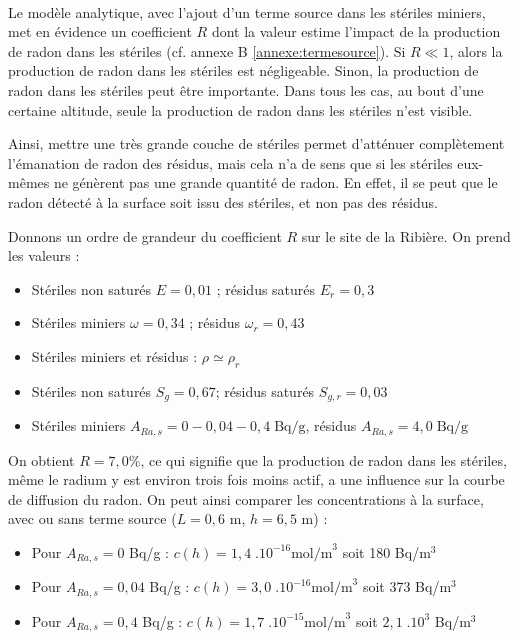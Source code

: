 \documentclass{article}
\begin{document}
\paragraph{} Le modèle analytique, avec l'ajout d'un terme source dans les stériles miniers, met en évidence un coefficient $R$ dont la valeur estime l'impact de la production de radon dans les stériles (cf. annexe B \ref{annexe:termesource}). Si $R\ll 1$, alors la production de radon dans les stériles est négligeable. Sinon, la production de radon dans les stériles peut être importante. Dans tous les cas, au bout d'une certaine altitude, seule la production de radon dans les stériles n'est visible.

Ainsi, mettre une très grande couche de stériles permet d'atténuer complètement l'émanation de radon des résidus, mais cela n'a de sens que si les stériles eux-mêmes ne génèrent pas une grande quantité de radon. En effet, il se peut que le radon détecté à la surface soit issu des stériles, et non pas des résidus.

Donnons un ordre de grandeur du coefficient $R$ sur le site de la Ribière. On prend les valeurs :
\begin{itemize}
  \item Stériles non saturés $E=0,01$ ; résidus saturés $E_r=0,3$ 
  \item Stériles miniers $\omega = 0,34$ ; résidus $\omega_r = 0,43 $
  \item Stériles miniers et résidus : $\rho \simeq \rho_r$
  \item Stériles non saturés $S_g = 0,67$; résidus saturés $S_{g,r}=0,03$
  \item Stériles miniers $A_{Ra,s}= 0 - 0,04 - 0,4 \; \text{Bq/g}$, résidus $A_{Ra,s}= 4,0 \; \text{Bq/g}$
\end{itemize}
On obtient $ R=7,0\%$, ce qui signifie que la production de radon dans les stériles, même le radium y est environ trois fois moins actif, a une influence sur la courbe de diffusion du radon. On peut ainsi comparer les concentrations à la surface, avec ou sans terme source ($L=0,6$ m, $h=6,5$ m) :
\begin{itemize}
  \item Pour $A_{Ra,s}=0$ Bq/g : $c(h) = 1,4 \; .10^{-16} \text{mol/m}^3$ soit 180 Bq/m$^3$
  \item Pour $A_{Ra,s}=0,04$ Bq/g : $c(h) = 3,0 \; .10^{-16} \text{mol/m}^3$ soit 373 Bq/m$^3$
  \item Pour $A_{Ra,s}=0,4$ Bq/g : $c(h) = 1,7 \; .10^{-15} \text{mol/m}^3$ soit $2,1 \; .10^3$ Bq/m$^3$
\end{itemize}
\end{document}
